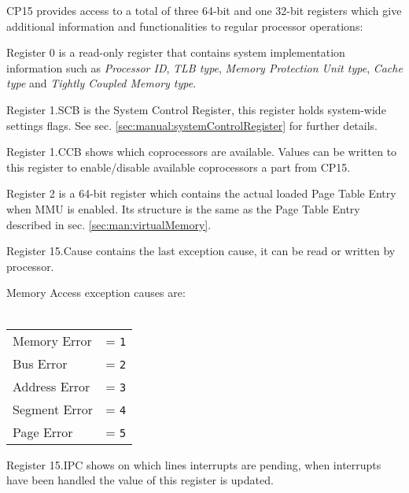 
CP15 provides access to a total of three 64-bit and one 32-bit registers which give additional information and functionalities to regular processor operations:

Register 0 is a read-only register that contains system implementation information such as \emph{Processor ID}, \emph{TLB type}, \emph{Memory Protection Unit type}, \emph{Cache type} and \emph{Tightly Coupled Memory type}.

Register 1.SCB is the System Control Register, this register holds system-wide settings flags.
See sec. \ref{sec:manual:systemControlRegister} for further details.

Register 1.CCB shows which coprocessors are available. Values can be written to this register to enable/disable available coprocessors a part from CP15.

\vspace{5px}
\begin{adjustbox}{center}

\end{adjustbox}
\vspace{5px}

Register 2 is a 64-bit register which contains the actual loaded Page Table Entry when MMU is enabled. Its structure is the same as the Page Table Entry described in sec. \ref{sec:man:virtualMemory}.

Register 15.Cause contains the last exception cause, it can be read or written by processor.

Memory Access exception causes are:
\\
\\
\begin{tabular}{ll}
Memory Error & = \texttt{1}\\
Bus Error & = \texttt{2}\\
Address Error & = \texttt{3}\\
Segment Error & = \texttt{4}\\
Page Error & = \texttt{5}\\
\end{tabular}

Register 15.IPC shows on which lines interrupts are pending, when interrupts have been handled the value of this register is updated.

